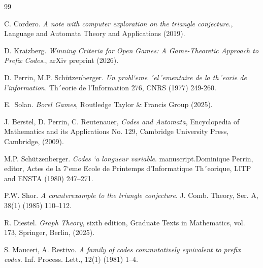 \documentclass[a4,12pt]{article}%
\begin{document}
\begin{thebibliography}{99}
\providecommand{\natexlab}[1]{#1}
\providecommand{\url}[1]{\texttt{#1}}
\providecommand{\urlprefix}{URL }

C. Cordero. \textit{A note with computer exploration on the triangle conjecture.}, Language and Automata Theory and Applications (2019).

D. Kraizberg. \textit{Winning Criteria for Open Games: A Game-Theoretic Approach to Prefix Codes.}, arXiv preprint (2026).

D. Perrin, M.P. Sch\"{u}tzenberger. \textit{Un probl`eme ´el´ementaire de la th´eorie de l’information.} Th´eorie de l’Information 276, CNRS (1977) 249-260.

E.~Solan.
\textit{Borel Games}, 
Routledge Taylor \& Francis Group (2025).

J. Berstel, D. Perrin, C. Reutenauer, \textit{Codes and Automata}, Encyclopedia of Mathematics and its Applications No. 129, Cambridge University Press, Cambridge, (2009).

M.P. Sch\"{u}tzenberger. \textit{Codes `a longueur variable}. manuscript.Dominique Perrin, editor, Actes de la 7`eme Ecole de Printemps d’Informatique Th´eorique, LITP and ENSTA (1980) 247–271.

P.W. Shor. \textit{A counterexample to the triangle conjecture}. J. Comb. Theory, Ser. A, 38(1) (1985) 110–112.

 R. Diestel. \textit{Graph Theory}, sixth edition, Graduate Texts in Mathematics, vol. 173, Springer, Berlin, (2025).

S. Mauceri, A. Restivo. \textit{A family of codes commutatively equivalent to prefix codes.} Inf. Process. Lett., 12(1) (1981) 1–4.

\end{thebibliography}
\end{document}
